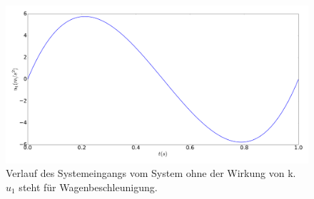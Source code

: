 \begin{beispiel}[Doppelintegrator]
	
	
	\begin{figure}
		\centering
		\includegraphics[width=12cm]{bild/30_32/test0_ohne_k_ori_u.pdf}
		\caption{Verlauf des Systemeingangs vom System ohne der Wirkung von k. $u_{1}$ steht für Wagenbeschleunigung.}
		\label{fig:Doppelintegrator_ohne_k_u}
	\end{figure}
	

\end{beispiel}
